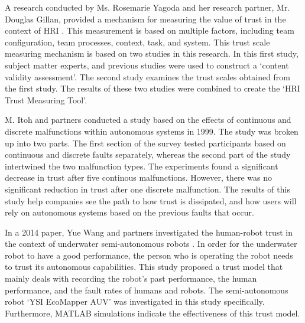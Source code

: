 \documentclass[runningheads,a4paper]{llncs}
\begin{document}
A research conducted by Ms. Rosemarie Yagoda and her research partner, Mr. Douglas Gillan, provided a mechanism for measuring the value of trust in the context of HRI \cite{yagoda2012you}. This measurement is based on multiple factors, including team configuration, team processes, context, task, and system. This trust scale measuring mechanism is based on two studies in this research. In this first study, subject matter experts, and previous studies were used to construct a `content validity assessment'. The second study examines the trust scales obtained from the first study. The results of these two studies were combined to create the `HRI Trust Measuring Tool'.


M. Itoh and partners conducted a study based on the effects of continuous and discrete malfunctions within autonomous systems in 1999\cite{itoh1999trust}.  The study was broken up into two parts.  The first section of the survey tested participants based on continuous and discrete faults separately, whereas the second part of the study intertwined the two malfunction types.  The experiments found a significant decrease in trust after five continous malfunctions.  However, there was no significant reduction in trust after one discrete malfunction.  The results of this study help companies see the path to how trust is dissipated, and how users will rely on autonomous systems based on the previous faults that occur.


In a 2014 paper, Yue Wang and partners investigated the human-robot trust in the context of underwater semi-autonomous robots \cite{wang2014human}. In order for the underwater robot to have a good performance, the person who is operating the robot needs to trust its autonomous capabilities. This study proposed a trust model that mainly deals with recording the robot's past performance, the human performance, and the fault rates of humans and robots. The semi-autonomous robot `YSI EcoMapper AUV' was investigated in this study specifically. Furthermore, MATLAB simulations indicate the effectiveness of this trust model.
\end{document}
